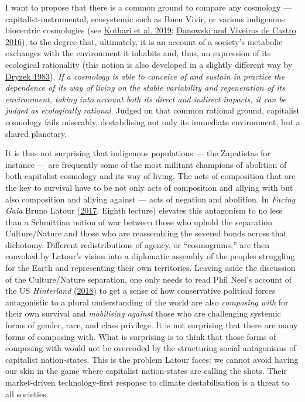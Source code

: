 \documentclass[a4paper, nobind]{templates/ociamthesis}
\begin{document}
I want to propose that there is a common ground to compare any cosmology --- capitalist-instrumental, ecosystemic such as Buen Vivir, or various indigenous biocentric cosmologies (see \protect\hyperlink{ref-kothari_pluriverse_2019}{Kothari et al. 2019}; \protect\hyperlink{ref-danowski_ends_2016}{Danowski and Viveiros de Castro 2016}), to the degree that, ultimately, it is an account of a society's metabolic exchanges with the environment it inhabits and, thus, an expression of its ecological rationality (this notion is also developed in a slightly different way by \protect\hyperlink{ref-dryzek_ecological_1983}{Dryzek 1983}). \emph{If a cosmology is able to conceive of and sustain in practice the dependence of its way of living on the stable variability and regeneration of its environment, taking into account both its direct and indirect impacts, it can be judged as ecologically rational}. Judged on that common rational ground, capitalist cosmology fails miserably, destabilising not only its immediate environment, but a shared planetary.

It is thus not surprising that indigenous populations --- the Zapatistas for instance --- are frequently some of the most militant champions of abolition of both capitalist cosmology and its way of living. The acts of composition that are the key to survival have to be not only acts of composition and allying with but also composition and allying against --- acts of negation and abolition. In \emph{Facing Gaia} Bruno Latour (\protect\hyperlink{ref-latour_facing_2017}{2017}, Eighth lecture) elevates this antagonism to no less than a Schmittian notion of war between those who uphold the separation Culture/Nature and those who are reassembling the severed bonds across that dichotomy. Different redistributions of agency, or ``cosmograms,'' are then convoked by Latour's vision into a diplomatic assembly of the peoples struggling for the Earth and representing their own territories. Leaving aside the discussion of the Culture/Nature separation, one only needs to read Phil Neel's account of the US \emph{Hinterland} (\protect\hyperlink{ref-neel_hinterland_2018}{2018}) to get a sense of how conservative political forces antagonistic to a plural understanding of the world are also \emph{composing with} for their own survival and \emph{mobilising against} those who are challenging systemic forms of gender, race, and class privilege. It is not surprising that there are many forms of composing with. What is surprising is to think that those forms of composing with would not be overcoded by the structuring social antagonisms of capitalist nation-states. This is the problem Latour faces: we cannot avoid having our skin in the game where capitalist nation-states are calling the shots. Their market-driven technology-first response to climate destabilisation is a threat to all societies.
\end{document}
